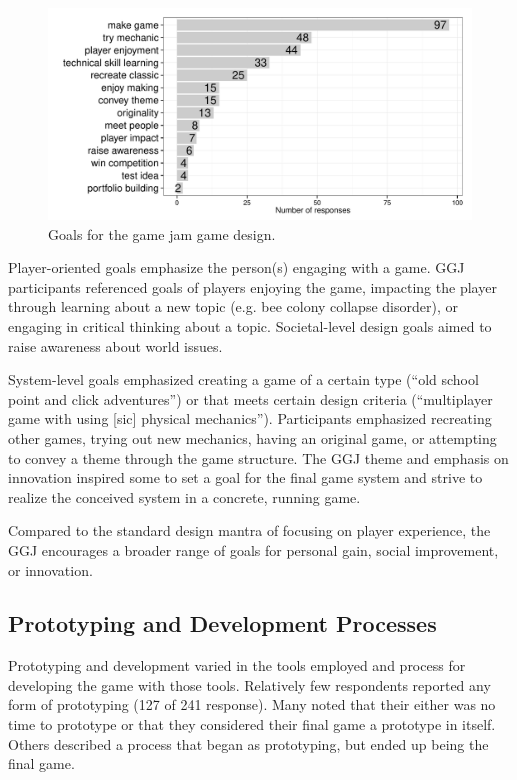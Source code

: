 \documentclass{sig-alternate}
\begin{document}
\begin{figure}[tbph]
\centering
\includegraphics[width=\linewidth]{./goals}
\caption{Goals for the game jam game design.}
\label{fig:goals}
\end{figure}



Player-oriented goals emphasize the person(s) engaging with a game.
GGJ participants referenced goals of players enjoying the game, impacting the player through learning about a new topic (e.g. bee colony collapse disorder), or engaging in critical thinking about a topic. Societal-level design goals aimed to raise awareness about world issues.

System-level goals emphasized creating a game of a certain type (``old school point and click adventures'') or that meets certain design criteria (``multiplayer game with using [sic] physical mechanics''). Participants emphasized recreating other games, trying out new mechanics, having an original game, or attempting to convey a theme through the game structure. The GGJ theme and emphasis on innovation inspired some to set a goal for the final game system and strive to realize the conceived system in a concrete, running game.

Compared to the standard design mantra of focusing on player experience, the GGJ encourages a broader range of goals for personal gain, social improvement, or innovation. 


\subsection{Prototyping and Development Processes}
Prototyping and development varied in the tools employed and process for developing the game with those tools. Relatively few respondents reported any form of prototyping (127 of 241 response). Many noted that their either was no time to prototype or that they considered their final game a prototype in itself. Others described a process that began as prototyping, but ended up being the final game.
\end{document}
